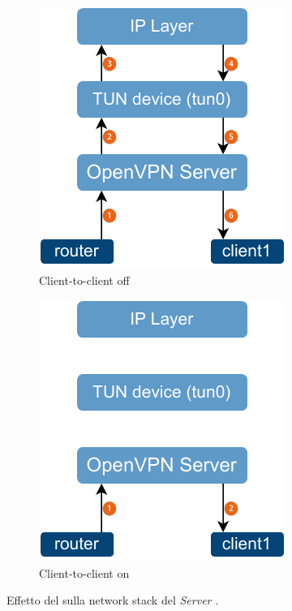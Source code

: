 \begin{figure}[H]
    \centering
    \begin{subfigure}{0.49\linewidth}
        \centering
        \includegraphics[width=0.8\linewidth]{immagini/diag2-client-to-client-off}
        \caption{Client-to-client off}
        \label{fig:diag2-client-to-client-off}
    \end{subfigure}
    \hfill
    \begin{subfigure}{0.49\linewidth}
        \centering
        \includegraphics[width=0.8\linewidth]{immagini/diag2-client-to-client-on}
        \caption{Client-to-client on}
        \label{fig:diag2-client-to-client-on}
    \end{subfigure}
    \cprotect\caption{Effetto del  sulla network stack del \textit{Server} \cite{client-to-client}.}
\end{figure}


